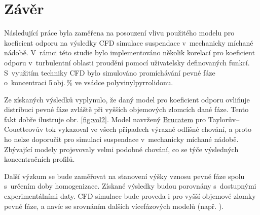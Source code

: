 \chapter{Závěr}
Následující práce byla zaměřena na posouzení vlivu použitého modelu pro koeficient odporu na výsledky CFD simulace suspendace v~mechanicky míchané nádobě. V~rámci této studie bylo implementováno několik korelací pro koeficient odporu v~turbulentní oblasti proudění pomocí uživatelsky definovaných funkcí. S~využitím techniky CFD bylo simulováno promíchávání pevné fáze o~koncentraci 5\,obj.\,\% ve vsádce polyvinylpyrrolidonu.

Ze získaných výsledků vyplynulo, že daný model pro koeficient odporu ovliňuje distribuci pevné fáze zvláště při vyšších objemových zlomcích dané fáze. Tento fakt dobře ilustruje obr. \ref{fig:vol2}. Model navržený \hyperlink{hyp:cds}{Brucatem} pro Taylorův–Couetteovův tok vykazoval ve všech případech výrazně odlišné chování, a proto ho nelze doporučit pro simulaci suspendace v~mechanicky míchané nádobě. Zbývající modely projevovaly velmi podobné chování, co se týče výsledných koncentračních profilů. 

Další výzkum se bude zaměřovat na stanovení výšky vznosu pevné fáze spolu s~určením doby homogenizace. Získané výsledky budou porovnány s~dostupnými experimentálními daty. CFD simulace bude proveda i pro vyšší objemové zlomky pevné fáze, a navíc se srovnáním dalších vícefázových modelů (např. ).  
